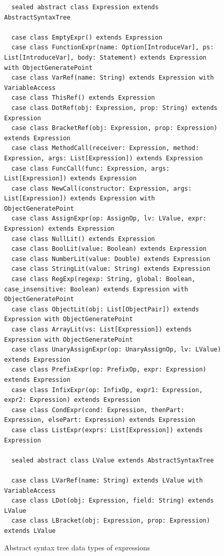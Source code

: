 \documentclass{article}
\begin{document}
\begin{figure}
{}
\begin{lstlisting}
  sealed abstract class Expression extends AbstractSyntaxTree

  case class EmptyExpr() extends Expression
  case class FunctionExpr(name: Option[IntroduceVar], ps: List[IntroduceVar], body: Statement) extends Expression with ObjectGeneratePoint
  case class VarRef(name: String) extends Expression with VariableAccess
  case class ThisRef() extends Expression
  case class DotRef(obj: Expression, prop: String) extends Expression
  case class BracketRef(obj: Expression, prop: Expression) extends Expression
  case class MethodCall(receiver: Expression, method: Expression, args: List[Expression]) extends Expression
  case class FuncCall(func: Expression, args: List[Expression]) extends Expression
  case class NewCall(constructor: Expression, args: List[Expression]) extends Expression with ObjectGeneratePoint
  case class AssignExpr(op: AssignOp, lv: LValue, expr: Expression) extends Expression
  case class NullLit() extends Expression
  case class BoolLit(value: Boolean) extends Expression
  case class NumberLit(value: Double) extends Expression
  case class StringLit(value: String) extends Expression
  case class RegExp(regexp: String, global: Boolean, case_insensitive: Boolean) extends Expression with ObjectGeneratePoint
  case class ObjectLit(obj: List[ObjectPair]) extends Expression with ObjectGeneratePoint
  case class ArrayLit(vs: List[Expression]) extends Expression with ObjectGeneratePoint
  case class UnaryAssignExpr(op: UnaryAssignOp, lv: LValue) extends Expression
  case class PrefixExpr(op: PrefixOp, expr: Expression) extends Expression
  case class InfixExpr(op: InfixOp, expr1: Expression, expr2: Expression) extends Expression
  case class CondExpr(cond: Expression, thenPart: Expression, elsePart: Expression) extends Expression
  case class ListExpr(exprs: List[Expression]) extends Expression

  sealed abstract class LValue extends AbstractSyntaxTree

  case class LVarRef(name: String) extends LValue with VariableAccess
  case class LDot(obj: Expression, field: String) extends LValue
  case class LBracket(obj: Expression, prop: Expression) extends LValue
\end{lstlisting}
\caption{Abstract syntax tree data types of expressions}
\label{fig:js-expr}
\end{figure}
\end{document}
